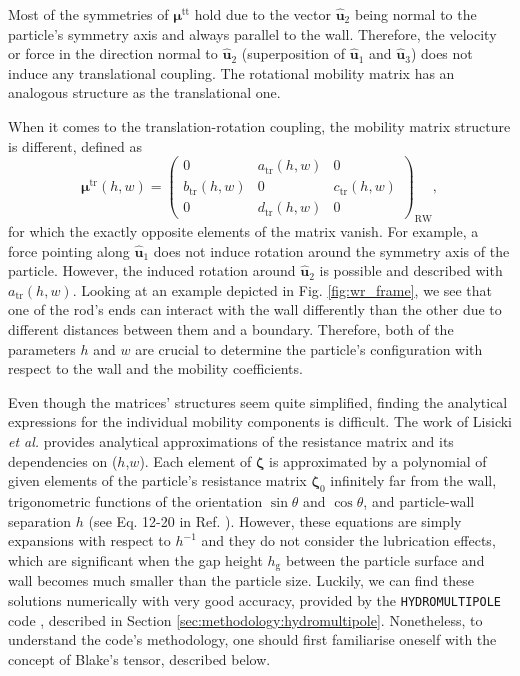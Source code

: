 \documentclass{master_thesis}
\def\code#1{\texttt{#1}}
\begin{document}
Most of the symmetries of $\bm{\mu}^{\textrm{tt}}$ hold due to the vector $\hat{\boldsymbol{u}}_2$ being normal to the particle's symmetry axis and always parallel to the wall. Therefore, the velocity or force in the direction normal to $\hat{\boldsymbol{u}}_2$ (superposition of $\hat{\boldsymbol{u}}_1$ and $\hat{\boldsymbol{u}}_3$) does not induce any translational coupling. The rotational mobility matrix has an analogous structure as the translational one.

When it comes to the translation-rotation coupling, the mobility matrix structure is different, defined as
\begin{equation}
    \bm{\mu}^{\textrm{tr}}(h,w)=\begin{pmatrix}
    0 & a_{\textrm{tr}}(h,w) & 0 \\
    b_{\textrm{tr}}(h,w) & 0 & c_{\textrm{tr}}(h,w) \\
    0 & d_{\textrm{tr}}(h,w) & 0
    \end{pmatrix}_{\textrm{RW}},
\label{eqn:mobility_tr}
\end{equation}
for which the exactly opposite elements of the matrix vanish. For example, a force pointing along $\hat{\boldsymbol{u}}_1$ does not induce rotation around the symmetry axis of the particle. However, the induced rotation around $\hat{\boldsymbol{u}}_2$ is possible and described with $a_{\textrm{tr}}(h,w)$. Looking at an example depicted in Fig. \ref{fig:wr_frame}, we see that one of the rod's ends can interact with the wall differently than the other due to different distances between them and a boundary. Therefore, both of the parameters $h$ and $w$ are crucial to determine the particle's configuration with respect to the wall and the mobility coefficients.

Even though the matrices' structures seem quite simplified, finding the analytical expressions for the individual mobility components is difficult. The work of Lisicki \textit{et al.} \cite{lisicki2016} provides analytical approximations of the resistance matrix and its dependencies on ($h$,$w$). Each element of $\bm{\zeta}$ is approximated by a polynomial of given elements of the particle's resistance matrix $\bm{\zeta}_0$ infinitely far from the wall, trigonometric functions of the orientation $\sin\theta$ and $\cos\theta$, and particle-wall separation $h$ (see Eq. 12-20 in Ref. \cite{lisicki2016}). However, these equations are simply expansions with respect to $h^{-1}$ and they do not consider the lubrication effects, which are significant when the gap height $h_{\textrm{g}}$ between the particle surface and wall becomes much smaller than the particle size. Luckily, we can find these solutions numerically with very good accuracy, provided by the \code{HYDROMULTIPOLE} code \cite{cichocki2000}, described in Section \ref{sec:methodology:hydromultipole}. Nonetheless, to understand the code's methodology, one should first familiarise oneself with the concept of Blake's tensor, described below.
\end{document}
